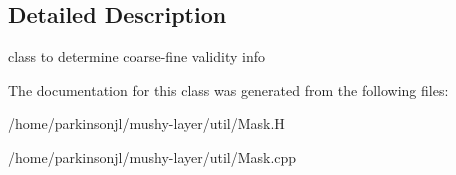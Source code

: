 \subsection{Detailed Description}
class to determine coarse-\/fine validity info 

The documentation for this class was generated from the following files\+:\begin{DoxyCompactItemize}
\item 
/home/parkinsonjl/mushy-\/layer/util/Mask.\+H\item 
/home/parkinsonjl/mushy-\/layer/util/Mask.\+cpp\end{DoxyCompactItemize}
